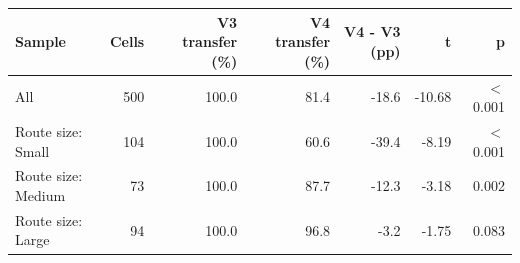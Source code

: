 \begin{tabular}{lrrrrrr}
\toprule
Sample & Cells & V3 transfer (\%) & V4 transfer (\%) & V4 - V3 (pp) & t & p \\
\midrule
All & 500 & 100.0 & 81.4 & -18.6 & -10.68 & \ensuremath{<}0.001 \\
Route size: Small & 104 & 100.0 & 60.6 & -39.4 & -8.19 & \ensuremath{<}0.001 \\
Route size: Medium & 73 & 100.0 & 87.7 & -12.3 & -3.18 & 0.002 \\
Route size: Large & 94 & 100.0 & 96.8 & -3.2 & -1.75 & 0.083 \\
\bottomrule
\end{tabular}

